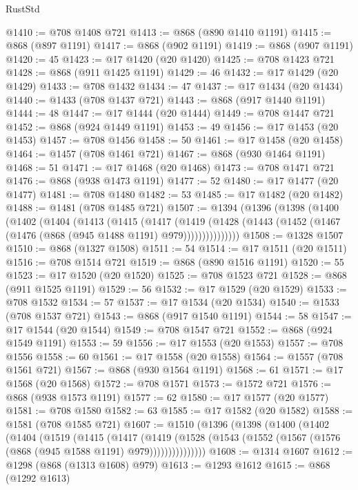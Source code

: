 \begin{lexlean}{RustStd}
\begin{coremodule}
@1410 := @708 @1408 @721
@1413 := @868 (@890 @1410 @1191)
@1415 := @868 (@897 @1191)
@1417 := @868 (@902 @1191)
@1419 := @868 (@907 @1191)
@1420 := 45
@1423 := @17 @1420 (@20 @1420)
@1425 := @708 @1423 @721
@1428 := @868 (@911 @1425 @1191)
@1429 := 46
@1432 := @17 @1429 (@20 @1429)
@1433 := @708 @1432
@1434 := 47
@1437 := @17 @1434 (@20 @1434)
@1440 := @1433 (@708 @1437 @721)
@1443 := @868 (@917 @1440 @1191)
@1444 := 48
@1447 := @17 @1444 (@20 @1444)
@1449 := @708 @1447 @721
@1452 := @868 (@924 @1449 @1191)
@1453 := 49
@1456 := @17 @1453 (@20 @1453)
@1457 := @708 @1456
@1458 := 50
@1461 := @17 @1458 (@20 @1458)
@1464 := @1457 (@708 @1461 @721)
@1467 := @868 (@930 @1464 @1191)
@1468 := 51
@1471 := @17 @1468 (@20 @1468)
@1473 := @708 @1471 @721
@1476 := @868 (@938 @1473 @1191)
@1477 := 52
@1480 := @17 @1477 (@20 @1477)
@1481 := @708 @1480
@1482 := 53
@1485 := @17 @1482 (@20 @1482)
@1488 := @1481 (@708 @1485 @721)
@1507 := @1394
    (@1396
      (@1398
        (@1400
          (@1402
            (@1404
              (@1413
                (@1415
                  (@1417
                    (@1419
                      (@1428
                        (@1443 (@1452 (@1467 (@1476 (@868 (@945 @1488 @1191) @979)))))))))))))))
@1508 := @1328 @1507
@1510 := @868 (@1327 @1508)
@1511 := 54
@1514 := @17 @1511 (@20 @1511)
@1516 := @708 @1514 @721
@1519 := @868 (@890 @1516 @1191)
@1520 := 55
@1523 := @17 @1520 (@20 @1520)
@1525 := @708 @1523 @721
@1528 := @868 (@911 @1525 @1191)
@1529 := 56
@1532 := @17 @1529 (@20 @1529)
@1533 := @708 @1532
@1534 := 57
@1537 := @17 @1534 (@20 @1534)
@1540 := @1533 (@708 @1537 @721)
@1543 := @868 (@917 @1540 @1191)
@1544 := 58
@1547 := @17 @1544 (@20 @1544)
@1549 := @708 @1547 @721
@1552 := @868 (@924 @1549 @1191)
@1553 := 59
@1556 := @17 @1553 (@20 @1553)
@1557 := @708 @1556
@1558 := 60
@1561 := @17 @1558 (@20 @1558)
@1564 := @1557 (@708 @1561 @721)
@1567 := @868 (@930 @1564 @1191)
@1568 := 61
@1571 := @17 @1568 (@20 @1568)
@1572 := @708 @1571
@1573 := @1572 @721
@1576 := @868 (@938 @1573 @1191)
@1577 := 62
@1580 := @17 @1577 (@20 @1577)
@1581 := @708 @1580
@1582 := 63
@1585 := @17 @1582 (@20 @1582)
@1588 := @1581 (@708 @1585 @721)
@1607 := @1510
    (@1396
      (@1398
        (@1400
          (@1402
            (@1404
              (@1519
                (@1415
                  (@1417
                    (@1419
                      (@1528
                        (@1543 (@1552 (@1567 (@1576 (@868 (@945 @1588 @1191) @979)))))))))))))))
@1608 := @1314 @1607
@1612 := @1298 (@868 (@1313 @1608) @979)
@1613 := @1293 @1612
@1615 := @868 (@1292 @1613)

\end{coremodule}
\end{lexlean}
